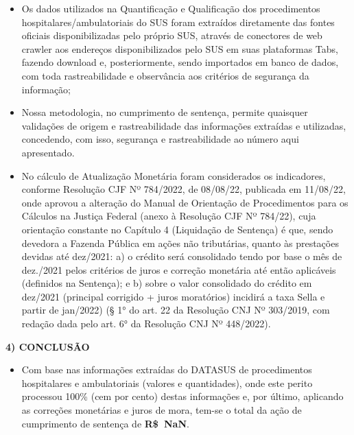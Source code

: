 \documentclass{article}
\begin{document}
    \begin{itemize}
    \item Os dados utilizados na Quantificação e Qualificação dos procedimentos hospitalares/ambulatoriais do SUS foram extraídos diretamente das fontes oficiais disponibilizadas pelo próprio SUS, através de conectores de web crawler aos endereços disponibilizados pelo SUS em suas plataformas Tabs, fazendo download e, posteriormente, sendo importados em banco de dados, com toda rastreabilidade e observância aos critérios de segurança da informação;

    \item Nossa metodologia, no cumprimento de sentença, permite quaisquer validações de origem e rastreabilidade das informações extraídas e utilizadas, concedendo, com isso, segurança e rastreabilidade ao número aqui apresentado.

    \item No cálculo de Atualização Monetária foram considerados os indicadores, conforme Resolução CJF Nº 784/2022, de 08/08/22, publicada em 11/08/22, onde aprovou a alteração do Manual de Orientação de Procedimentos para os Cálculos na Justiça Federal (anexo à Resolução CJF Nº 784/22), cuja orientação constante no Capítulo 4 (Liquidação de Sentença) é que, sendo devedora a Fazenda Pública em ações não tributárias, quanto às prestações devidas até dez/2021: a) o crédito será consolidado tendo por base o mês de dez./2021 pelos critérios de juros e correção monetária até então aplicáveis (definidos na Sentença); e b) sobre o valor consolidado do crédito em dez/2021 (principal corrigido + juros moratórios) incidirá a taxa Sella e partir de jan/2022) (§ 1° do art. 22 da Resolução CNJ Nº 303/2019, com redação dada pelo art. 6° da Resolução CNJ Nº 448/2022).
    \end{itemize}

    \vspace{10mm}

    \textbf{4) CONCLUSÃO}

    \begin{itemize}
    \item Com base nas informações extraídas do DATASUS de procedimentos hospitalares e ambulatoriais (valores e quantidades), onde este perito processou 100\% (cem por cento) destas informações e, por último, aplicando as correções monetárias e juros de mora, tem-se o total da ação de cumprimento de sentença de \textbf{R\$ NaN}.
    \end{itemize}
\end{document}
